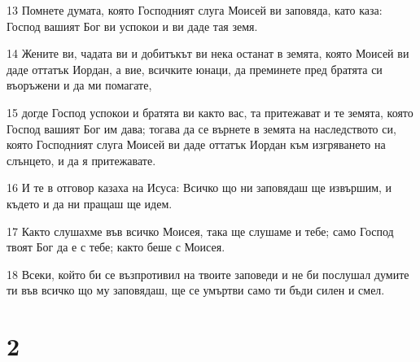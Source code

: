 \par 13 Помнете думата, която Господният слуга Моисей ви заповяда, като каза: Господ вашият Бог ви успокои и ви даде тая земя.
\par 14 Жените ви, чадата ви и добитъкът ви нека останат в земята, която Моисей ви даде оттатък Иордан, а вие, всичките юнаци, да преминете пред братята си въоръжени и да ми помагате,
\par 15 догде Господ успокои и братята ви както вас, та притежават и те земята, която Господ вашият Бог им дава; тогава да се върнете в земята на наследството си, която Господният слуга Моисей ви даде оттатък Иордан към изгряването на слънцето, и да я притежавате.
\par 16 И те в отговор казаха на Исуса: Всичко що ни заповядаш ще извършим, и където и да ни пращаш ще идем.
\par 17 Както слушахме във всичко Моисея, така ще слушаме и тебе; само Господ твоят Бог да е с тебе; както беше с Моисея.
\par 18 Всеки, който би се възпротивил на твоите заповеди и не би послушал думите ти във всичко що му заповядаш, ще се умъртви само ти бъди силен и смел.

\chapter{2}

